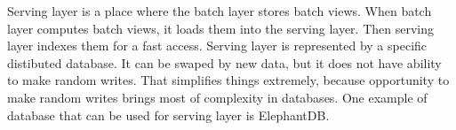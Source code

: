 
Serving layer is a place where the batch layer stores batch views.
When batch layer computes batch views, it loads them into the serving layer.
Then serving layer indexes them for a fast access.
Serving layer is represented by a specific distibuted database. 
It can be swaped by new data, but it does not have ability to make random
writes.
That simplifies things extremely, because opportunity to make random writes
brings most of complexity in databases.
One example of database that can be used for serving layer is ElephantDB.